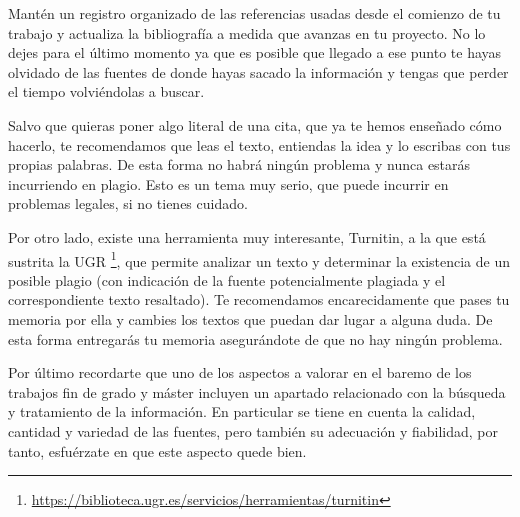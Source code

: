 Mantén un registro organizado de las referencias usadas desde el comienzo de tu trabajo y actualiza la bibliografía a medida que avanzas en tu proyecto. No lo dejes para el último momento ya que es posible que llegado a ese punto te hayas olvidado de las fuentes de donde hayas sacado la información y tengas que perder el tiempo volviéndolas a buscar.

Salvo que quieras poner algo literal de una cita, que ya te hemos enseñado cómo hacerlo, te recomendamos que leas el texto, entiendas la idea y lo escribas con tus propias palabras. De esta forma no habrá ningún problema y nunca estarás incurriendo en plagio. Esto es un tema muy serio, que puede incurrir en problemas legales, si no tienes cuidado. 

Por otro lado, existe una herramienta muy interesante, Turnitin, a la que está sustrita la UGR \footnote{\url{https://biblioteca.ugr.es/servicios/herramientas/turnitin}}, que permite analizar un texto y determinar la existencia de un posible plagio (con indicación de la fuente potencialmente plagiada y el correspondiente texto resaltado). Te recomendamos encarecidamente que pases tu memoria por ella y cambies los textos que puedan dar lugar a alguna duda. De esta forma entregarás tu memoria asegurándote de que no hay ningún problema.

Por último recordarte que uno de los aspectos a valorar en el baremo de los trabajos fin de grado y máster incluyen un apartado relacionado con la búsqueda y tratamiento de la información. En particular se tiene en cuenta la calidad, cantidad y variedad de las fuentes, pero también su adecuación y fiabilidad, por tanto, esfuérzate en que este aspecto quede bien.
